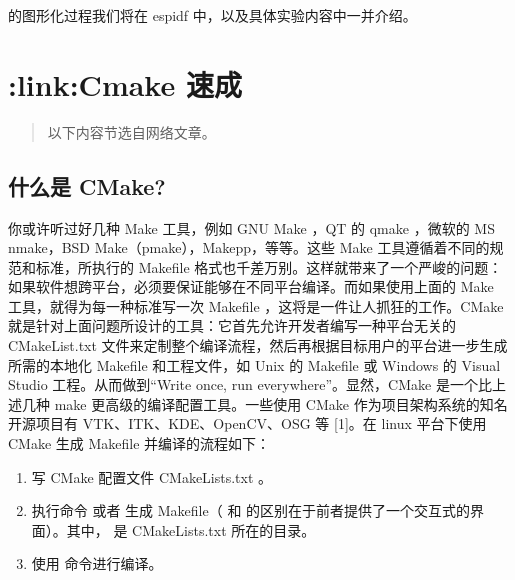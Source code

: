 \documentclass[a4paper,12pt,english]{sphinxmanual}
\begin{document}
\sphinxAtStartPar
{} 的图形化过程我们将在 esp\sphinxhyphen{}idf 中，以及具体实验内容中一并介绍。

\sphinxstepscope


\section{:link:Cmake 速成}
\label{\detokenize{dev-board/cmake:link-cmake}}\label{\detokenize{dev-board/cmake::doc}}\begin{quote}

\sphinxAtStartPar
以下内容节选自网络文章。
\end{quote}


\subsection{什么是 CMake?}
\label{\detokenize{dev-board/cmake:cmake}}
\sphinxAtStartPar
你或许听过好几种 Make 工具，例如 GNU Make ，QT 的 qmake ，微软的 MS nmake，BSD Make（pmake），Makepp，等等。这些 Make 工具遵循着不同的规范和标准，所执行的 Makefile 格式也千差万别。这样就带来了一个严峻的问题：如果软件想跨平台，必须要保证能够在不同平台编译。而如果使用上面的 Make 工具，就得为每一种标准写一次 Makefile ，这将是一件让人抓狂的工作。CMake 就是针对上面问题所设计的工具：它首先允许开发者编写一种平台无关的 CMakeList.txt 文件来定制整个编译流程，然后再根据目标用户的平台进一步生成所需的本地化 Makefile 和工程文件，如 Unix 的 Makefile 或 Windows 的 Visual Studio 工程。从而做到“Write once, run everywhere”。显然，CMake 是一个比上述几种 make 更高级的编译配置工具。一些使用 CMake 作为项目架构系统的知名开源项目有 VTK、ITK、KDE、OpenCV、OSG 等 {[}1{]}。在 linux 平台下使用 CMake 生成 Makefile 并编译的流程如下：
\begin{enumerate}
%
\item {} 
\sphinxAtStartPar
写 CMake 配置文件 CMakeLists.txt 。

\item {} 
\sphinxAtStartPar
执行命令  或者  生成 Makefile（ 和  的区别在于前者提供了一个交互式的界面）。其中，  是 CMakeLists.txt 所在的目录。

\item {} 
\sphinxAtStartPar
使用  命令进行编译。

\end{enumerate}
\end{document}
